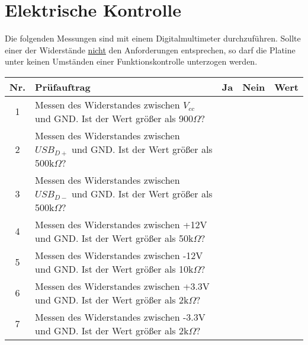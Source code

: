 \documentclass[a4paper,12pt]{article}
\begin{document}
\section{Elektrische Kontrolle}
Die folgenden Messungen sind mit einem Digitalmultimeter durchzuführen. Sollte einer der Widerstände \underline{nicht} den Anforderungen entsprechen, so darf die Platine unter keinen Umständen einer Funktionskontrolle unterzogen werden.
\begin{flushleft}
	\begin{tabular}{|c||p{10cm}|c|c|p{2cm}|}
		\hline
		Nr. & Prüfauftrag & Ja & Nein & Wert\\
		\hline
		1 & Messen des Widerstandes zwischen $V_{cc}$ und GND. Ist der Wert größer als 900$\Omega$? & & &\\
		\hline
		2 & Messen des Widerstandes zwischen $USB_{D+}$ und GND. Ist der Wert größer als 500k$\Omega$? & & & \\
		\hline
		3 & Messen des Widerstandes zwischen $USB_{D-}$ und GND. Ist der Wert größer als 500k$\Omega$? & & & \\			\hline
		4 & Messen des Widerstandes zwischen +12V und GND. Ist der Wert größer als 50k$\Omega$? & & & \\
		\hline
		5 & Messen des Widerstandes zwischen -12V und GND. Ist der Wert größer als 10k$\Omega$? &&& \\
		\hline
		6 & Messen des Widerstandes zwischen +3.3V und GND. Ist der Wert größer als 2k$\Omega$? &&& \\
		\hline
		7 & Messen des Widerstandes zwischen -3.3V und GND. Ist der Wert größer als 2k$\Omega$? &&& \\
		\hline
	\end{tabular}
\end{flushleft}
\end{document}
